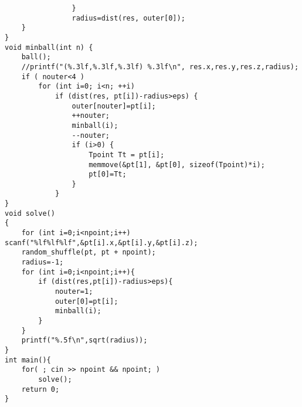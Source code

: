 \begin{lstlisting}
				}
				radius=dist(res, outer[0]);
	}
}
void minball(int n) {
	ball();
	//printf("(%.3lf,%.3lf,%.3lf) %.3lf\n", res.x,res.y,res.z,radius);
	if ( nouter<4 )
		for (int i=0; i<n; ++i)
			if (dist(res, pt[i])-radius>eps) {
				outer[nouter]=pt[i];
				++nouter;
				minball(i);
				--nouter;
				if (i>0) {
					Tpoint Tt = pt[i];
					memmove(&pt[1], &pt[0], sizeof(Tpoint)*i);
					pt[0]=Tt;
				}
			}
}
void solve()
{
	for (int i=0;i<npoint;i++) scanf("%lf%lf%lf",&pt[i].x,&pt[i].y,&pt[i].z);
	random_shuffle(pt, pt + npoint);
	radius=-1;
	for (int i=0;i<npoint;i++){
		if (dist(res,pt[i])-radius>eps){
			nouter=1;
			outer[0]=pt[i];
			minball(i);
		}
	}
	printf("%.5f\n",sqrt(radius));
}
int main(){
	for( ; cin >> npoint && npoint; )
		solve();
	return 0;
}
\end{lstlisting}
